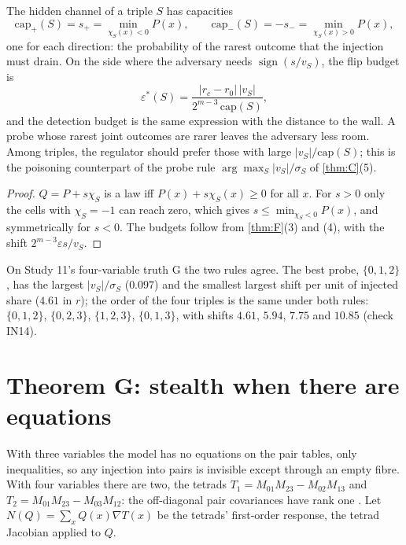 \documentclass[11pt]{article}
\theoremstyle{definition}\newtheorem{definition}{Definition}\newtheorem{remark}{Remark}
\begin{document}
\begin{corollary}\label{cor:capacity}
The hidden channel of a triple $S$ has capacities
\[
\mathrm{cap}_+(S)=s_+=\min_{\chi_S(x)<0}P(x),\qquad \mathrm{cap}_-(S)=-s_-=\min_{\chi_S(x)>0}P(x),
\]
one for each direction: the probability of the rarest outcome that the injection must drain. On the side where the adversary needs
$\operatorname{sign}(s/v_S)$, the flip budget is
\[
\varepsilon^*(S)=\frac{|r_c-r_0|\,|v_S|}{2^{m-3}\,\mathrm{cap}(S)} ,
\]
and the detection budget is the same expression with the distance to the wall. A probe whose rarest joint outcomes are rarer leaves the
adversary less room. Among triples, the regulator should prefer those with large $|v_S|/\mathrm{cap}(S)$; this is the poisoning
counterpart of the probe rule $\arg\max_S|v_S|/\sigma_S$ of \cref{thm:C}(5).
\end{corollary}

\begin{proof}
$Q=P+s\chi_S$ is a law iff $P(x)+s\chi_S(x)\ge0$ for all $x$. For $s>0$ only the cells with $\chi_S=-1$ can reach zero, which gives
$s\le\min_{\chi_S<0}P(x)$, and symmetrically for $s<0$. The budgets follow from \cref{thm:F}(3) and (4), with the shift
$2^{m-3}\varepsilon s/v_S$.
\end{proof}

On Study 11's four-variable truth G the two rules agree. The best probe, $\{0,1,2\}$, has the largest $|v_S|/\sigma_S$ ($0.097$) and the
smallest largest shift per unit of injected share ($4.61$ in $r$); the order of the four triples is the same under both rules:
$\{0,1,2\}$, $\{0,2,3\}$, $\{1,2,3\}$, $\{0,1,3\}$, with shifts $4.61$, $5.94$, $7.75$ and $10.85$ (check IN14).

\section{Theorem G: stealth when there are equations}\label{sec:G}
With three variables the model has no equations on the pair tables, only inequalities, so any injection into pairs is invisible
except through an empty fibre. With four variables there are two, the tetrads $T_1=M_{01}M_{23}-M_{02}M_{13}$ and
$T_2=M_{01}M_{23}-M_{03}M_{12}$: the off-diagonal pair covariances have rank one \cite{DrtonSturmfelsSullivant2007}. Let
$N(Q)=\sum_xQ(x)\nabla T(x)$ be the tetrads' first-order response, the tetrad Jacobian applied to $Q$.
\end{document}
